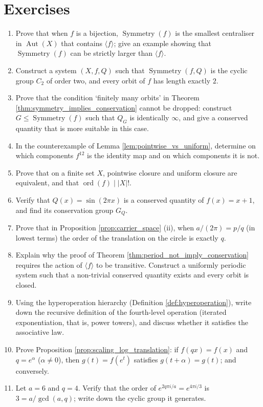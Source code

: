\endgroup

\section*{Exercises}

\begin{enumerate}[leftmargin=3em, label=\textbf{Exercise \arabic*}]
    \item Prove that when $f$ is a bijection, $\operatorname{Symmetry}(f)$ is the smallest centraliser in $\operatorname{Aut}(X)$ that contains $\langle f\rangle$; give an example showing that $\operatorname{Symmetry}(f)$ can be strictly larger than $\langle f\rangle$.
    \item Construct a system $(X,f,Q)$ such that $\operatorname{Symmetry}(f,Q)$ is the cyclic group $C_2$ of order two, and every orbit of $f$ has length exactly $2$.
    \item Prove that the condition `finitely many orbits' in Theorem \ref{thm:symmetry_implies_conservation} cannot be dropped: construct $G\le\operatorname{Symmetry}(f)$ such that $Q_G$ is identically $\infty$, and give a conserved quantity that is more suitable in this case.
    \item In the counterexample of Lemma \ref{lem:pointwise_vs_uniform}, determine on which components $f^{12}$ is the identity map and on which components it is not.
    \item Prove that on a finite set $X$, pointwise closure and uniform closure are equivalent, and that $\operatorname{ord}(f)\mid |X|!$.
    \item Verify that $Q(x)=\sin(2\pi x)$ is a conserved quantity of $f(x)=x+1$, and find its conservation group $G_Q$.
    \item Prove that in Proposition \ref{prop:carrier_space} (ii), when $a/(2\pi)=p/q$ (in lowest terms) the order of the translation on the circle is exactly $q$.
    \item Explain why the proof of Theorem \ref{thm:period_not_imply_conservation} requires the action of $\langle f\rangle$ to be transitive. Construct a uniformly periodic system such that a non-trivial conserved quantity exists and every orbit is closed.
    \item Using the hyperoperation hierarchy (Definition \ref{def:hyperoperation}), write down the recursive definition of the fourth-level operation (iterated exponentiation, that is, power towers), and discuss whether it satisfies the associative law.
    \item Prove Proposition \ref{prop:scaling_log_translation}: if $f(qx)=f(x)$ and $q=e^\alpha$ ($\alpha\neq 0$), then $g(t)=f(e^t)$ satisfies $g(t+\alpha)=g(t)$; and conversely.
    \item Let $a=6$ and $q=4$. Verify that the order of $e^{2q\pi i/a}=e^{4\pi i/3}$ is $3=a/\gcd(a,q)$; write down the cyclic group it generates.
\end{enumerate}

